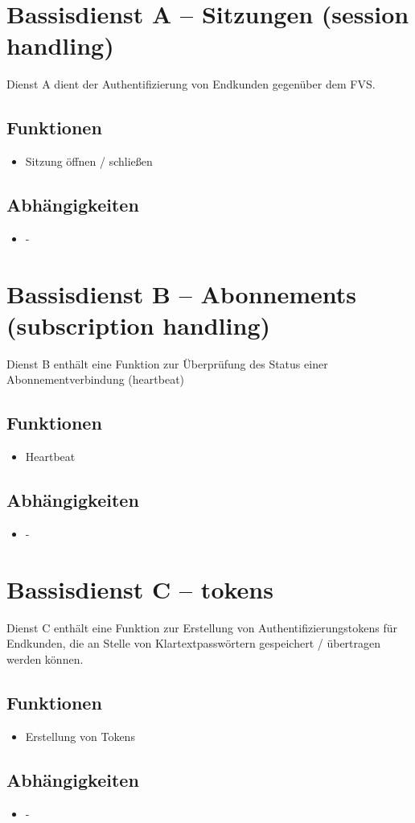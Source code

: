 \section{Bassisdienst A -- Sitzungen (session handling)}
Dienst A dient der Authentifizierung von Endkunden gegenüber dem FVS.

\subsection*{Funktionen}
\begin{itemize}
\item Sitzung öffnen / schließen
\end{itemize}

\subsection*{Abhängigkeiten}
\begin{itemize}
\item -
\end{itemize}


\section{Bassisdienst B -- Abonnements (subscription handling)}
Dienst B enthält eine Funktion zur Überprüfung des Status einer Abonnementverbindung (heartbeat)

\subsection*{Funktionen}
\begin{itemize}
\item Heartbeat
\end{itemize}

\subsection*{Abhängigkeiten}
\begin{itemize}
\item -
\end{itemize}

\section{Bassisdienst C -- tokens}
Dienst C enthält eine Funktion zur Erstellung von Authentifizierungstokens für Endkunden, die an Stelle von Klartextpasswörtern gespeichert / übertragen werden können.

\subsection*{Funktionen}
\begin{itemize}
\item Erstellung von Tokens
\end{itemize}

\subsection*{Abhängigkeiten}
\begin{itemize}
\item -
\end{itemize}

